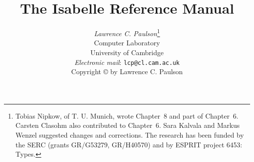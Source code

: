 \title{The Isabelle Reference Manual}

\author{{\em Lawrence C. Paulson}\thanks
{Tobias Nipkow, of T. U. Munich, wrote Chapter~8 and part of Chapter~6.
 Carsten Clasohm also contributed to Chapter~6.
 Sara Kalvala and Markus Wenzel suggested changes and corrections.
 The research has been funded by the SERC (grants GR/G53279, GR/H40570)
  and by ESPRIT project 6453: Types.} 
\\  
        Computer Laboratory \\ University of Cambridge \\[2ex]
        {\small{\em Electronic mail\/}: {\tt lcp@cl.cam.ac.uk}} \\[3cm]
    {\small Copyright \copyright{} \number\year{} by Lawrence C. Paulson}
}
\date{} 
\makeindex

\underscoreoff

\setcounter{secnumdepth}{1} \setcounter{tocdepth}{2}

\pagestyle{headings}
\sloppy
\binperiod     %



\maketitle 
{} \tableofcontents \clearfirst














\begingroup
   \small\raggedright\frenchspacing
  
\endgroup


